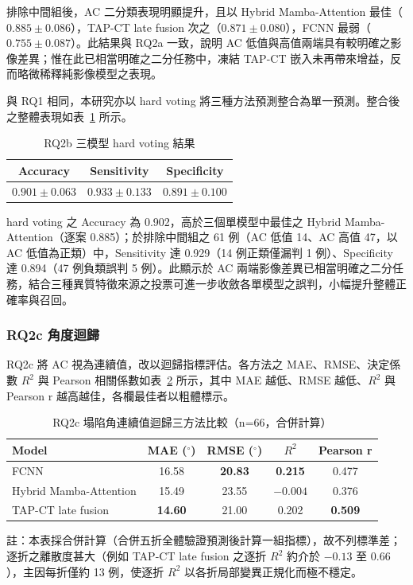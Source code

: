 \begin{ZhChapter}
排除中間組後，AC 二分類表現明顯提升，且以 Hybrid Mamba-Attention 最佳（\(0.885 \pm 0.086\)），TAP-CT late fusion 次之（\(0.871 \pm 0.080\)），FCNN 最弱（\(0.755 \pm 0.087\)）。此結果與 RQ2a 一致，說明 AC 低值與高值兩端具有較明確之影像差異；惟在此已相當明確之二分任務中，凍結 TAP-CT 嵌入未再帶來增益，反而略微稀釋純影像模型之表現。

與 RQ1 相同，本研究亦以 hard voting 將三種方法預測整合為單一預測。整合後之整體表現如表~\ref{tab:rq2b_vote} 所示。

\begin{table}[htbp]
\centering
\caption{RQ2b 三模型 hard voting 結果}
\label{tab:rq2b_vote}
\begingroup
\renewcommand{\arraystretch}{1.25}
\begin{tabular}{ccc}
\hline
Accuracy & Sensitivity & Specificity \\
\hline
\(0.901 \pm 0.063\) & \(0.933 \pm 0.133\) & \(0.891 \pm 0.100\) \\
\hline
\end{tabular}
\endgroup
\end{table}

hard voting 之 Accuracy 為 0.902，高於三個單模型中最佳之 Hybrid Mamba-Attention（逐案 0.885）；於排除中間組之 61 例（AC 低值 14、AC 高值 47，以 AC 低值為正類）中，Sensitivity 達 0.929（14 例正類僅漏判 1 例）、Specificity 達 0.894（47 例負類誤判 5 例）。此顯示於 AC 兩端影像差異已相當明確之二分任務，結合三種異質特徵來源之投票可進一步收斂各單模型之誤判，小幅提升整體正確率與召回。

\subsubsection{RQ2c 角度迴歸}

RQ2c 將 AC 視為連續值，改以迴歸指標評估。各方法之 MAE、RMSE、決定係數 \(R^2\) 與 Pearson 相關係數如表~\ref{tab:rq2c_regression} 所示，其中 MAE 越低、RMSE 越低、\(R^2\) 與 Pearson r 越高越佳，各欄最佳者以粗體標示。

\begin{table}[htbp]
\centering
\caption{RQ2c 塌陷角連續值迴歸三方法比較（n=66，合併計算）}
\label{tab:rq2c_regression}
\begingroup
\renewcommand{\arraystretch}{1.25}
\begin{tabularx}{0.95\textwidth}{>{\raggedright\arraybackslash}X c c c c}
\hline
Model & MAE (\(^{\circ}\)) & RMSE (\(^{\circ}\)) & \(R^2\) & Pearson r \\
\hline
FCNN & 16.58 & \textbf{20.83} & \textbf{0.215} & 0.477 \\
Hybrid Mamba-Attention & 15.49 & 23.55 & \(-0.004\) & 0.376 \\
TAP-CT late fusion & \textbf{14.60} & 21.00 & 0.202 & \textbf{0.509} \\
\hline
\end{tabularx}
\par\vspace{0.4em}
{\footnotesize 註：本表採合併計算（合併五折全體驗證預測後計算一組指標），故不列標準差；逐折之離散度甚大（例如 TAP-CT late fusion 之逐折 \(R^2\) 約介於 \(-0.13\) 至 \(0.66\)），主因每折僅約 13 例，使逐折 \(R^2\) 以各折局部變異正規化而極不穩定。}
\endgroup
\end{table}


\end{ZhChapter}
